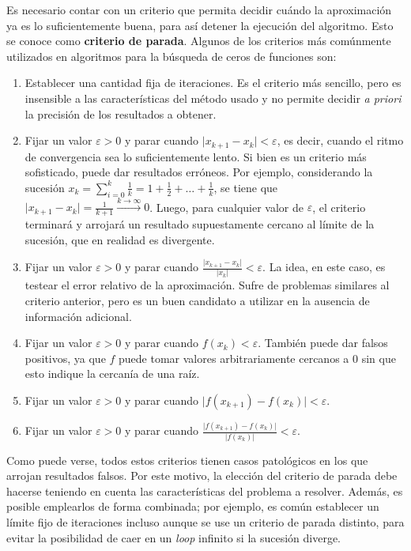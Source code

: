 Es necesario contar con un criterio que permita decidir cuándo la aproximación
ya es lo suficientemente buena, para así detener la ejecución del algoritmo.
Esto se conoce como \textbf{criterio de parada}. Algunos de los criterios más
comúnmente utilizados en algoritmos para la búsqueda de ceros de funciones
son:
\begin{enumerate}[label=(\roman*)]
\item Establecer una cantidad fija de iteraciones. Es el criterio más sencillo,
    pero es insensible a las características del método usado y no permite
    decidir \emph{a priori} la precisión de los resultados a obtener.
\item Fijar un valor $\varepsilon > 0$ y parar cuando
    $\lvert x_{k+1} - x_k \rvert < \varepsilon$, es decir, cuando el ritmo de
    convergencia sea lo suficientemente lento. Si bien es un criterio más
    sofisticado, puede dar resultados erróneos. Por ejemplo, considerando la
    sucesión $x_k = \sum_{i=0}^k \frac{1}{k} = 1 + \frac{1}{2} + \dots +
    \frac{1}{k}$, se tiene que $\lvert x_{k+1} - x_k \rvert = \frac{1}{k+1}
    \xrightarrow{k \to \infty} 0$. Luego, para cualquier valor de
    $\varepsilon$, el criterio terminará y arrojará un resultado
    supuestamente cercano al límite de la sucesión, que en realidad es
    divergente.
\item Fijar un valor $\varepsilon > 0$ y parar cuando
    $\frac{\lvert x_{k+1} - x_k \rvert}{\lvert x_k \rvert} < \varepsilon$. La
    idea, en este caso, es testear el error relativo de la aproximación.
    Sufre de problemas similares al criterio anterior, pero es un buen
    candidato a utilizar en la ausencia de información adicional.
\item Fijar un valor $\varepsilon > 0$ y parar cuando $f(x_k) < \varepsilon$.
    También puede dar falsos positivos, ya que $f$ puede tomar valores
    arbitrariamente cercanos a $0$ sin que esto indique la cercanía de una
    raíz.
\item Fijar un valor $\varepsilon > 0$ y parar cuando $\lvert f(x_{k+1}) -
    f(x_k) \rvert < \varepsilon$.
\item Fijar un valor $\varepsilon > 0$ y parar cuando $\frac{\lvert f(x_{k+1})
    - f(x_k) \rvert}{\lvert f(x_k)\rvert} < \varepsilon$.
\end{enumerate}

Como puede verse, todos estos criterios tienen casos patológicos en los que
arrojan resultados falsos. Por este motivo, la elección del criterio de parada
debe hacerse teniendo en cuenta las características del problema a resolver.
Además, es posible emplearlos de forma combinada; por ejemplo, es común
establecer un límite fijo de iteraciones incluso aunque se use un criterio de
parada distinto, para evitar la posibilidad de caer en un \emph{loop} infinito
si la sucesión diverge.

